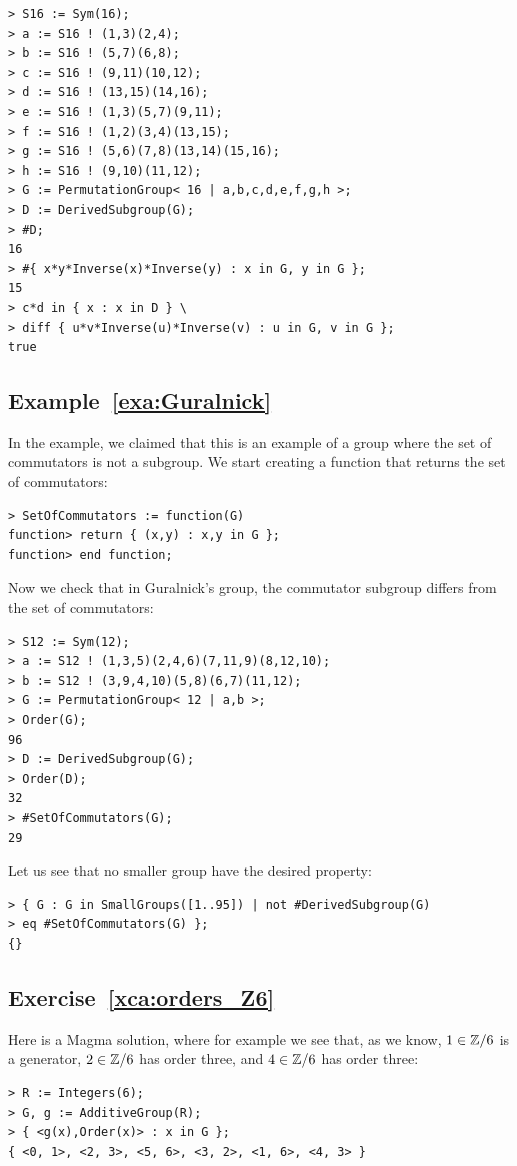 \begin{lstlisting}
> S16 := Sym(16);
> a := S16 ! (1,3)(2,4);
> b := S16 ! (5,7)(6,8);
> c := S16 ! (9,11)(10,12);
> d := S16 ! (13,15)(14,16);
> e := S16 ! (1,3)(5,7)(9,11);
> f := S16 ! (1,2)(3,4)(13,15);
> g := S16 ! (5,6)(7,8)(13,14)(15,16);
> h := S16 ! (9,10)(11,12);
> G := PermutationGroup< 16 | a,b,c,d,e,f,g,h >;
> D := DerivedSubgroup(G);
> #D;
16
> #{ x*y*Inverse(x)*Inverse(y) : x in G, y in G };
15    
> c*d in { x : x in D } \ 
> diff { u*v*Inverse(u)*Inverse(v) : u in G, v in G };
true
\end{lstlisting}

\subsection*{Example~\ref{exa:Guralnick}}
\label{magma:Guralnick}

In the example, we claimed that 
this is an example of a group where the set of commutators is not a subgroup. We 
start creating a function that returns the set of commutators:
\begin{lstlisting}
> SetOfCommutators := function(G)
function> return { (x,y) : x,y in G };
function> end function;
\end{lstlisting}
Now we check that in Guralnick's group, the commutator subgroup 
differs from the set of commutators: 
\begin{lstlisting}
> S12 := Sym(12);
> a := S12 ! (1,3,5)(2,4,6)(7,11,9)(8,12,10);
> b := S12 ! (3,9,4,10)(5,8)(6,7)(11,12);
> G := PermutationGroup< 12 | a,b >;
> Order(G);
96
> D := DerivedSubgroup(G);
> Order(D);
32
> #SetOfCommutators(G);
29
\end{lstlisting}
Let us see that no smaller group 
have the desired property: 
\begin{lstlisting}
> { G : G in SmallGroups([1..95]) | not #DerivedSubgroup(G) 
> eq #SetOfCommutators(G) };
{}
\end{lstlisting}



\subsection*{Exercise~\ref{xca:orders_Z6}}

Here is a Magma solution, where for example we see that, as we know,
$1\in\mathbb{Z}/6$ is a generator, 
$2\in\mathbb{Z}/6$ has order three, and $4\in\mathbb{Z}/6$ has order three:
\begin{lstlisting}
> R := Integers(6);
> G, g := AdditiveGroup(R);
> { <g(x),Order(x)> : x in G };
{ <0, 1>, <2, 3>, <5, 6>, <3, 2>, <1, 6>, <4, 3> }   
\end{lstlisting}

